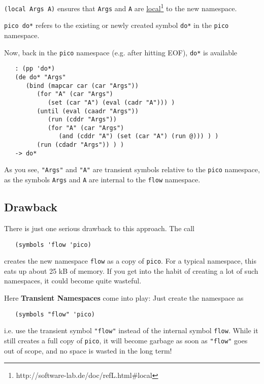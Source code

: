 \texttt{(local Args A)} ensures that \texttt{Args} and \texttt{A} are
\underline{local}\footnote{http://software-lab.de/doc/refL.html\#local} to the new namespace.

\texttt{pico~do*} refers to the existing or newly created symbol \texttt{do*} in the \texttt{pico}
namespace.

Now, back in the \texttt{pico} namespace (e.g. after hitting EOF), \texttt{do*} is available
\begin{verbatim}
   : (pp 'do*)
   (de do* "Args"
      (bind (mapcar car (car "Args"))
         (for "A" (car "Args")
            (set (car "A") (eval (cadr "A"))) )
         (until (eval (caadr "Args"))
            (run (cddr "Args"))
            (for "A" (car "Args")
               (and (cddr "A") (set (car "A") (run @))) ) )
         (run (cdadr "Args")) ) )
   -> do*
\end{verbatim}

As you see, \texttt{"Args"} and \texttt{"A"} are transient symbols relative to the \texttt{pico}
namespace, as the symbols \texttt{Args} and \texttt{A} are internal to the \texttt{flow}
namespace.

\subsection{Drawback}
\label{sec:transient-namespaces-drawback}


There is just one serious drawback to this approach. The call
\begin{verbatim}
   (symbols 'flow 'pico)
\end{verbatim}

creates the new namespace \texttt{flow} as a copy of \texttt{pico}. For a typical namespace,
this eats up about 25 kB of memory. If you get into the habit of creating a lot
of such namespaces, it could become quite wasteful.

Here \textbf{Transient Namespaces} come into play: Just create the namespace as
\begin{verbatim}
   (symbols "flow" 'pico)
\end{verbatim}

i.e. use the transient symbol \texttt{"flow"} instead of the internal symbol \texttt{flow}.
While it still creates a full copy of \texttt{pico}, it will become garbage as soon as
\texttt{"flow"} goes out of scope, and no space is wasted in the long term!

